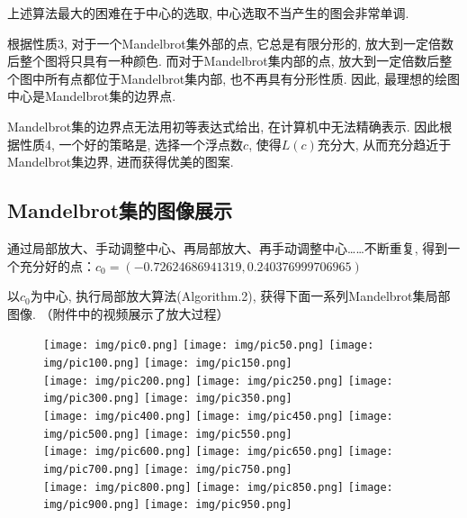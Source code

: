 \documentclass[UTF8]{ctexart}
\begin{document}
上述算法最大的困难在于中心的选取, 中心选取不当产生的图会非常单调. 

根据性质3, 对于一个Mandelbrot集外部的点, 它总是有限分形的, 放大到一定倍数后整个图将只具有一种颜色. 而对于Mandelbrot集内部的点, 放大到一定倍数后整个图中所有点都位于Mandelbrot集内部, 也不再具有分形性质. 因此, 最理想的绘图中心是Mandelbrot集的边界点. 

Mandelbrot集的边界点无法用初等表达式给出, 在计算机中无法精确表示. 因此根据性质4, 一个好的策略是, 选择一个浮点数$c$, 使得$L(c)$充分大, 从而充分趋近于Mandelbrot集边界, 进而获得优美的图案. 

\subsection{Mandelbrot集的图像展示}

通过局部放大、手动调整中心、再局部放大、再手动调整中心……不断重复, 得到一个充分好的点：$c_0=(-0.72624686941319,0.240376999706965)$

以$c_0$为中心, 执行局部放大算法(Algorithm.2), 获得下面一系列Mandelbrot集局部图像. （附件中的视频展示了放大过程）

\begin{figure}[H]
    \centering
    \texttt{[image: img/pic0.png]}
    \texttt{[image: img/pic50.png]}
    \texttt{[image: img/pic100.png]}
    \texttt{[image: img/pic150.png]}
    \\
    \centering
    \vspace{3pt} \texttt{[image: img/pic200.png]}
    \texttt{[image: img/pic250.png]}
    \texttt{[image: img/pic300.png]}
    \texttt{[image: img/pic350.png]}
    \\
    \centering
    \vspace{3pt} \texttt{[image: img/pic400.png]}
    \texttt{[image: img/pic450.png]}
    \texttt{[image: img/pic500.png]}
    \texttt{[image: img/pic550.png]}
    \\
    \centering
    \vspace{3pt} \texttt{[image: img/pic600.png]}
    \texttt{[image: img/pic650.png]}
    \texttt{[image: img/pic700.png]}
    \texttt{[image: img/pic750.png]}
    \\
    \centering
    \vspace{3pt} \texttt{[image: img/pic800.png]}
    \texttt{[image: img/pic850.png]}
    \texttt{[image: img/pic900.png]}
    \texttt{[image: img/pic950.png]}
    \\
\end{figure}
\end{document}
